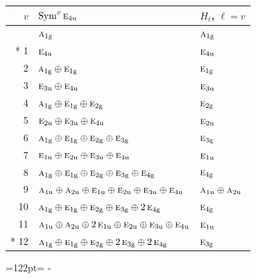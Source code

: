 \documentclass[10pt,a4paper]{article}
\newcommand{\needspace}[1]{\par\penalty-100\begingroup\dimen0=#1\relax\dimen2=\pagegoal
  \advance\dimen2-\pagetotal\ifdim\dimen0>\dimen2\relax\ifdim\dimen2>0pt\vfil\break\fi\fi
  \endgroup}
\numberwithin{equation}{section}
\newcommand{\irr}[1]{\text{\normalfont\scshape #1}}
\newcommand{\ptag}[1]{\mathrm{#1}}
\begin{document}
{\small\begin{longtable}{@{}rll@{}}\toprule
$v$ & $\operatorname{Sym}^{v}\irr{e}_{4\ptag{u}}$ & $H_\ell$, $\ell = v$\\\midrule\endhead
\bottomrule\endfoot\endlastfoot
0 & $\irr{a}_{1\ptag{g}}$ & $\irr{a}_{1\ptag{g}}$\\*
1 & $\irr{e}_{4\ptag{u}}$ & $\irr{e}_{4\ptag{u}}$\\
2 & $\irr{a}_{1\ptag{g}} \oplus \irr{e}_{1\ptag{g}}$ & $\irr{e}_{1\ptag{g}}$\\
3 & $\irr{e}_{3\ptag{u}} \oplus \irr{e}_{4\ptag{u}}$ & $\irr{e}_{3\ptag{u}}$\\
4 & $\irr{a}_{1\ptag{g}} \oplus \irr{e}_{1\ptag{g}} \oplus \irr{e}_{2\ptag{g}}$ & $\irr{e}_{2\ptag{g}}$\\
5 & $\irr{e}_{2\ptag{u}} \oplus \irr{e}_{3\ptag{u}} \oplus \irr{e}_{4\ptag{u}}$ & $\irr{e}_{2\ptag{u}}$\\
6 & $\irr{a}_{1\ptag{g}} \oplus \irr{e}_{1\ptag{g}} \oplus \irr{e}_{2\ptag{g}} \oplus \irr{e}_{3\ptag{g}}$ & $\irr{e}_{3\ptag{g}}$\\
7 & $\irr{e}_{1\ptag{u}} \oplus \irr{e}_{2\ptag{u}} \oplus \irr{e}_{3\ptag{u}} \oplus \irr{e}_{4\ptag{u}}$ & $\irr{e}_{1\ptag{u}}$\\
8 & $\irr{a}_{1\ptag{g}} \oplus \irr{e}_{1\ptag{g}} \oplus \irr{e}_{2\ptag{g}} \oplus \irr{e}_{3\ptag{g}} \oplus \irr{e}_{4\ptag{g}}$ & $\irr{e}_{4\ptag{g}}$\\
9 & $\irr{a}_{1\ptag{u}} \oplus \irr{a}_{2\ptag{u}} \oplus \irr{e}_{1\ptag{u}} \oplus \irr{e}_{2\ptag{u}} \oplus \irr{e}_{3\ptag{u}} \oplus \irr{e}_{4\ptag{u}}$ & $\irr{a}_{1\ptag{u}} \oplus \irr{a}_{2\ptag{u}}$\\
10 & $\irr{a}_{1\ptag{g}} \oplus \irr{e}_{1\ptag{g}} \oplus \irr{e}_{2\ptag{g}} \oplus \irr{e}_{3\ptag{g}} \oplus 2\,\irr{e}_{4\ptag{g}}$ & $\irr{e}_{4\ptag{g}}$\\
11 & $\irr{a}_{1\ptag{u}} \oplus \irr{a}_{2\ptag{u}} \oplus 2\,\irr{e}_{1\ptag{u}} \oplus \irr{e}_{2\ptag{u}} \oplus \irr{e}_{3\ptag{u}} \oplus \irr{e}_{4\ptag{u}}$ & $\irr{e}_{1\ptag{u}}$\\*
12 & $\irr{a}_{1\ptag{g}} \oplus \irr{e}_{1\ptag{g}} \oplus \irr{e}_{2\ptag{g}} \oplus 2\,\irr{e}_{3\ptag{g}} \oplus 2\,\irr{e}_{4\ptag{g}}$ & $\irr{e}_{3\ptag{g}}$\\
\bottomrule\end{longtable}}
\needspace{122pt}
\end{document}
